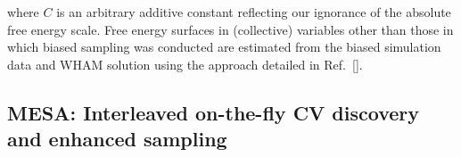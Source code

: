 \documentclass[12pt]{article}
\newcommand*{\blauw}[1]{#1}
\begin{document}
where $C$ is an arbitrary additive constant reflecting our ignorance of the absolute free energy scale.
Free energy surfaces in (collective) variables other than those in which biased sampling was conducted are estimated from the biased simulation data and WHAM solution using the approach detailed in Ref.~[\cite{ferguson2011integrating}].




\subsection{\sffamily \large MESA: Interleaved on-the-fly CV discovery and enhanced sampling}\label{integrate_US_with_autoencoder}
\end{document}
